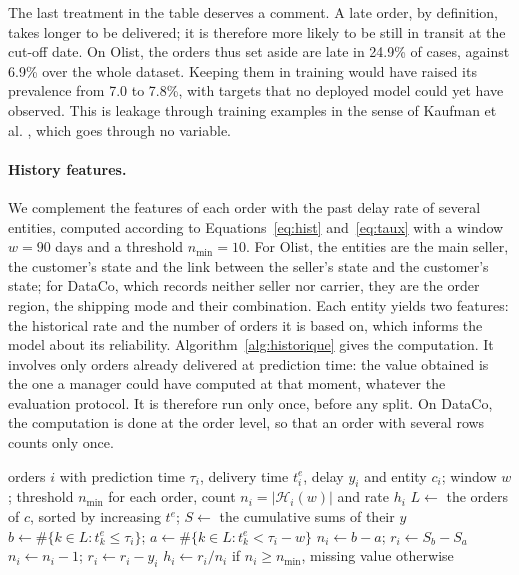 \documentclass[11pt,a4paper]{article}
\theoremstyle{definition}
\begin{document}
The last treatment in the table deserves a comment. A late order, by definition, takes longer to be delivered; it is therefore more likely to be still in transit at the cut-off date. On Olist, the orders thus set aside are late in 24.9\% of cases, against 6.9\% over the whole dataset. Keeping them in training would have raised its prevalence from 7.0 to 7.8\%, with targets that no deployed model could yet have observed. This is leakage through training examples in the sense of Kaufman et al. \cite{kaufman2012leakage}, which goes through no variable.

\paragraph{History features.} We complement the features of each order with the past delay rate of several entities, computed according to Equations~\eqref{eq:hist} and~\eqref{eq:taux} with a window $w = 90$ days and a threshold $n_{\min} = 10$. For Olist, the entities are the main seller, the customer's state and the link between the seller's state and the customer's state; for DataCo, which records neither seller nor carrier, they are the order region, the shipping mode and their combination. Each entity yields two features: the historical rate and the number of orders it is based on, which informs the model about its reliability. Algorithm~\ref{alg:historique} gives the computation. It involves only orders already delivered at prediction time: the value obtained is the one a manager could have computed at that moment, whatever the evaluation protocol. It is therefore run only once, before any split. On DataCo, the computation is done at the order level, so that an order with several rows counts only once.

\begin{algorithm}[!htbp]
\caption{Leakage-free historical delay rate of an entity}
\label{alg:historique}
\begin{algorithmic}[1]
\Require orders $i$ with prediction time $\tau_i$, delivery time $t_i^{e}$, delay $y_i$ and entity $c_i$; window $w$; threshold $n_{\min}$
\Ensure for each order, count $n_i = |\mathcal{H}_i(w)|$ and rate $h_i$
  \State $L \gets$ the orders of $c$, sorted by increasing $t^{e}$; $S \gets$ the cumulative sums of their $y$
    \State $b \gets \#\{k \in L : t_k^{e} \le \tau_i\}$; $a \gets \#\{k \in L : t_k^{e} < \tau_i - w\}$ 
    \State $n_i \gets b - a$; $r_i \gets S_b - S_a$
     
      \State $n_i \gets n_i - 1$; $r_i \gets r_i - y_i$
    \EndIf
    \State $h_i \gets r_i / n_i$ if $n_i \ge n_{\min}$, missing value otherwise
  \EndFor
\EndFor
\end{algorithmic}
\end{algorithm}
\end{document}
